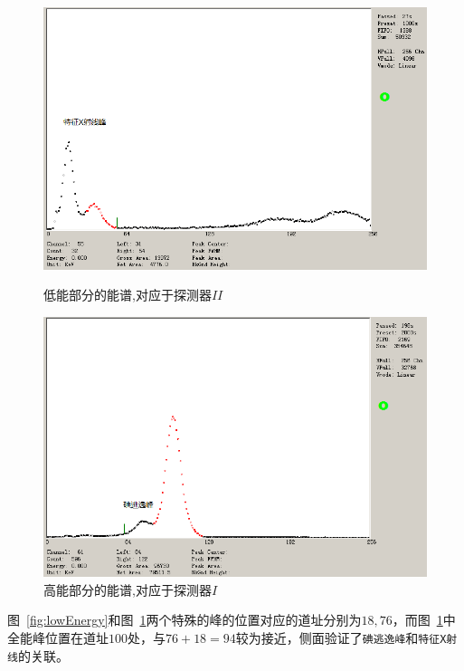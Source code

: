 \documentclass[12pt]{ctexart}
\begin{document}
\begin{figure}[htbp]
    \centering
    \begin{minipage}{0.45\textwidth}
        \centering
        \includegraphics[width=\textwidth]{data/lowEnergy.png}
        \caption{低能部分的能谱,对应于探测器$II$}
        \label{fig:lowEnergy}
    \end{minipage}
    \qquad
    \begin{minipage}{0.45\textwidth}
        \centering
        \includegraphics[width=\textwidth]{data/highEnergy.png}
        \caption{高能部分的能谱,对应于探测器$I$}
        \label{fig:highEnergy}
    \end{minipage}
\end{figure}
图~\ref{fig:lowEnergy}和图~\ref{fig:highEnergy}两个特殊的峰的位置对应的道址分别为$18,76$，而图~\ref{fig:highEnergy}中
全能峰位置在道址$100$处，与$76+18=94$较为接近，侧面验证了\texttt{碘逃逸峰}和\texttt{特征X射线}的关联。
\end{document}
